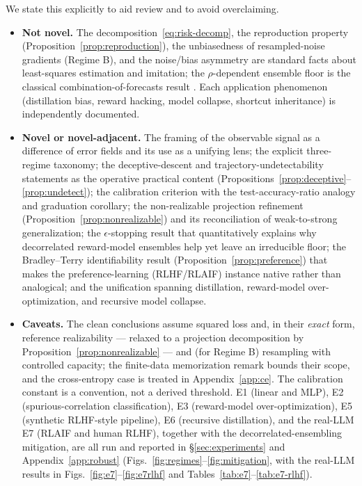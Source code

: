 \documentclass[10pt]{article} %
\theoremstyle{plain}
\theoremstyle{remark}
\begin{document}
We state this explicitly to aid review and to avoid overclaiming.
\begin{itemize}[leftmargin=1.4em,itemsep=2pt,topsep=2pt]
\item \textbf{Not novel.} The decomposition~\eqref{eq:risk-decomp}, the reproduction property (Proposition~\ref{prop:reproduction}), the unbiasedness of resampled-noise gradients (Regime B), and the noise/bias asymmetry are standard facts about least-squares estimation and imitation; the $\rho$-dependent ensemble floor is the classical combination-of-forecasts result \citep{bates1969}. Each application phenomenon (distillation bias, reward hacking, model collapse, shortcut inheritance) is independently documented.
\item \textbf{Novel or novel-adjacent.} The framing of the observable signal as a difference of error fields and its use as a unifying lens; the explicit three-regime taxonomy; the deceptive-descent and trajectory-undetectability statements as the operative practical content (Propositions~\ref{prop:deceptive}--\ref{prop:undetect}); the calibration criterion with the test-accuracy-ratio analogy and graduation corollary; the non-realizable projection refinement (Proposition~\ref{prop:nonrealizable}) and its reconciliation of weak-to-strong generalization; the $\epsilon$-stopping result that quantitatively explains why decorrelated reward-model ensembles help yet leave an irreducible floor; the Bradley--Terry identifiability result (Proposition~\ref{prop:preference}) that makes the preference-learning (RLHF/RLAIF) instance native rather than analogical; and the unification spanning distillation, reward-model over-optimization, and recursive model collapse.
\item \textbf{Caveats.} The clean conclusions assume squared loss and, in their \emph{exact} form, reference realizability --- relaxed to a projection decomposition by Proposition~\ref{prop:nonrealizable} --- and (for Regime B) resampling with controlled capacity; the finite-data memorization remark bounds their scope, and the cross-entropy case is treated in Appendix~\ref{app:ce}. The calibration constant is a convention, not a derived threshold. E1 (linear and MLP), E2 (spurious-correlation classification), E3 (reward-model over-optimization), E5 (synthetic RLHF-style pipeline), E6 (recursive distillation), and the real-LLM E7 (RLAIF and human RLHF), together with the decorrelated-ensembling mitigation, are all run and reported in \S\ref{sec:experiments} and Appendix~\ref{app:robust} (Figs.~\ref{fig:regimes}--\ref{fig:mitigation}, with the real-LLM results in Figs.~\ref{fig:e7}--\ref{fig:e7rlhf} and Tables~\ref{tab:e7}--\ref{tab:e7-rlhf}).
\end{itemize}
\end{document}
